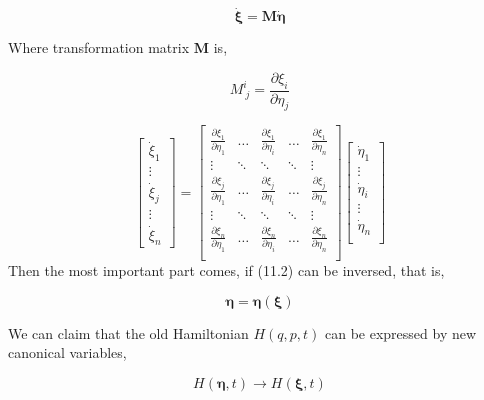 \documentclass[12pt]{article}
\numberwithin{equation}{section}
\begin{document}
\begin{equation}
    \dot{\pmb{\xi}} = \pmb{M} \pmb{\dot{\eta}}
\end{equation}

Where transformation matrix $\pmb{M}$ is,

\begin{center}
    \[ M^{i}_{\ j} = \frac{\partial \xi_i}{\partial \eta_j}\]
\end{center}

\[
    \begin{bmatrix}
        \dot{\xi}_1\\
        \vdots\\
        \dot \xi_j\\
        \vdots\\
        \dot \xi_n
    \end{bmatrix} = 
    \begin{bmatrix}
        \frac{\partial \xi_1}{\partial \eta_1}&\hdots&\frac{\partial \xi_1}{\partial \eta_i}&\hdots&\frac{\partial \xi_1}{\partial \eta_n}\\
        \vdots&\ddots&\ddots&\ddots&\vdots\\
        \frac{\partial \xi_j}{\partial \eta_1}&\hdots&\frac{\partial \xi_j}{\partial \eta_i}&\hdots&\frac{\partial \xi_j}{\partial \eta_n}\\
        \vdots&\ddots&\ddots&\ddots&\vdots\\
        \frac{\partial \xi_n}{\partial \eta_1}&\hdots&\frac{\partial \xi_n}{\partial \eta_i}&\hdots&\frac{\partial \xi_n}{\partial \eta_n}\\
    \end{bmatrix}
    \begin{bmatrix}
        \dot \eta_1\\
        \vdots\\
        \dot \eta_i\\
        \vdots\\
        \dot \eta_n\\
    \end{bmatrix}
\]
Then the most important part comes, if (11.2) can be inversed, that is,

\begin{equation}
    \pmb{\eta} = \pmb{\eta}(\pmb{\xi})
\end{equation}

We can claim that the old Hamiltonian $H(q, p, t)$ can be expressed by new canonical variables,

\[
    H(\pmb{\eta}, t) \rightarrow H(\pmb{\xi}, t)
\]
\end{document}
